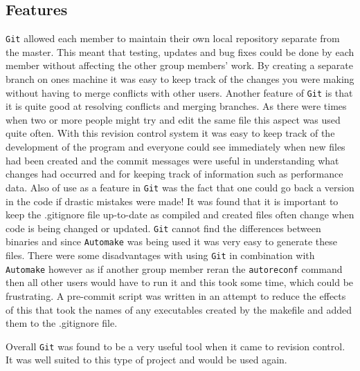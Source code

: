 \subsection{Features}
\texttt{Git} allowed each member to maintain their own local repository separate from the master.
This meant that testing, updates and bug fixes could be done by each member without affecting the other group members' work.
By creating a separate branch on ones machine it was easy to keep track of the changes you were making without having to merge conflicts with other users.
Another feature of \texttt{Git} is that it is quite good at resolving conflicts and merging branches.
As there were times when two or more people might try and edit the same file this aspect was used quite often.
With this revision control system it was easy to keep track of the development of the program and everyone could see immediately when new files had been created and the commit messages were useful in understanding what changes had occurred and for keeping track of information such as performance data.
Also of use as a feature in \texttt{Git} was the fact that one could go back a version in the code if drastic mistakes were made!
It was found that it is important to keep the .gitignore file up-to-date as compiled and created files often change when code is being changed or updated.
\texttt{Git} cannot find the differences between binaries and since \texttt{Automake} was being used it was very easy to generate these files.
There were some disadvantages with using \texttt{Git} in combination with \texttt{Automake} however as if another group member reran the \texttt{autoreconf} command then all other users would have to run it and this took some time, which could be frustrating.
A pre-commit script was written in an attempt to reduce the effects of this that took the names of any executables created by the makefile and added them to the .gitignore file.

Overall \texttt{Git} was found to be a very useful tool when it came to revision control.
It was well suited to this type of project and would be used again.
